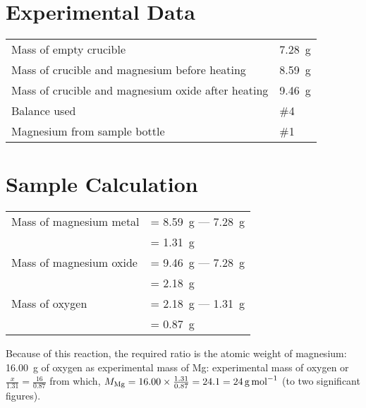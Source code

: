 \documentclass{article}
\begin{document}

\section{Experimental Data}

\begin{tabular}{ll}
Mass of empty crucible & \SI{7.28}{\gram}\\
Mass of crucible and magnesium before heating & \SI{8.59}{\gram}\\
Mass of crucible and magnesium oxide after heating & \SI{9.46}{\gram}\\
Balance used & \#4\\
Magnesium from sample bottle & \#1
\end{tabular}


\section{Sample Calculation}

\begin{tabular}{ll}
Mass of magnesium metal & = \SI{8.59}{\gram} --- \SI{7.28}{\gram}\\
& = \SI{1.31}{\gram}\\
Mass of magnesium oxide & = \SI{9.46}{\gram} --- \SI{7.28}{\gram}\\
& = \SI{2.18}{\gram}\\
Mass of oxygen & = \SI{2.18}{\gram} --- \SI{1.31}{\gram}\\
& = \SI{0.87}{\gram}
\end{tabular}

Because of this reaction, the required ratio is the atomic weight of magnesium:
\SI{16.00}{\gram} of oxygen as experimental mass of Mg: experimental mass of
oxygen or $\frac{x}{1.31}=\frac{16}{0.87}$ from which, $M_{\ce{Mg}} = 16.00
\times \frac{1.31}{0.87} = 24.1 = \SI{24}{\gram\per\mole}$ (to two significant
figures).

\end{document}
